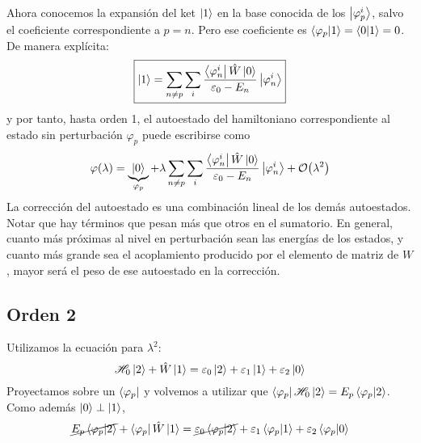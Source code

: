 Ahora conocemos la expansión del ket $\ket{1}$ en la base conocida de
los $\ket{\varphi_p^i}$, salvo el coeficiente correspondiente a $p = n$.
Pero ese coeficiente es $\braket{\varphi_p}{1} = \braket{0}{1} = 0$. De
manera explícita:
\begin{equation}
  \boxed{
 \ket{1} = \sum_{n\neq p} \sum_{i}
 \frac{\bra{\varphi_n^i}\hat{W}\ket{0}}{\varepsilon_0 - E_n} \ket{\varphi_n^i}
 \label{eq:ket1}}
\end{equation}
y por tanto, hasta orden 1, el autoestado del hamiltoniano
correspondiente al estado sin perturbación $\varphi_p$ puede escribirse como
\begin{equation}
 \varphi(\lambda) = \underbrace{\ket{0}}_{\varphi_p} +\lambda  \sum_{n\neq p} \sum_{i}
 \frac{\bra{\varphi_n^i}\hat{W}\ket{0}}{\varepsilon_0 - E_n} \ket{\varphi_n^i}
 + \order{\lambda^2}
\end{equation}
La corrección del autoestado es una combinación lineal de los demás
autoestados. Notar que hay términos que pesan más que otros en el
sumatorio. En general, cuanto más próximas al nivel en perturbación
sean las energías de los estados, y cuanto más grande sea el
acoplamiento producido por el elemento de matriz de $W$, mayor será el
peso de ese autoestado en la corrección. 

\subsection{Orden 2}
Utilizamos la ecuación para $\lambda^2$:
\begin{equation}
   \mathscr{H} _0 \ket{2} + \hat{W} \ket{1} = \varepsilon_0 \ket{2} +
  \varepsilon_1 \ket{1}  + \varepsilon_2 \ket{0}
\end{equation}
Proyectamos sobre un $\bra{\varphi_p}$ y volvemos a utilizar que $
\bra{\varphi_p}  \mathscr{H} _0 \ket{2} = E_p \braket{\varphi_p}{2}$. Como
además $\ket{0}\perp\ket{1}$,
\begin{equation}
 \cancel{ E_p \braket{\varphi_p}{2}} + \bra{\varphi_p}\hat{W}\ket{1} = \cancel{\varepsilon_0
  \braket{\varphi_p}{2}} + \varepsilon_1 \braket{\varphi_p}{1} +
\varepsilon_2\braket{\varphi_p}{0} 
\end{equation}

